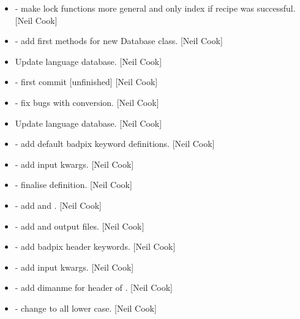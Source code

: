 \documentclass[a4paper,10pt,english]{report}
\begin{document}
\begin{itemize}
\item {} 
 - make lock functions more general and only index if
recipe was successful. {[}Neil Cook{]}

\item {} 
 - add first methods for new Database class. {[}Neil
Cook{]}

\item {} 
Update language database. {[}Neil Cook{]}

\item {} 
 - first commit {[}unfinished{]} {[}Neil Cook{]}

\item {} 
 - fix bugs with conversion. {[}Neil Cook{]}

\item {} 
Update language database. {[}Neil Cook{]}

\item {} 
 - add default badpix keyword definitions. {[}Neil Cook{]}

\item {} 
 - add input kwargs. {[}Neil Cook{]}

\item {} 
 - finalise  definition. {[}Neil Cook{]}

\item {} 
 - add  and . {[}Neil Cook{]}

\item {} 
 - add  and  output files.
{[}Neil Cook{]}

\item {} 
 - add badpix header keywords. {[}Neil Cook{]}

\item {} 
 - add input kwargs. {[}Neil Cook{]}

\item {} 
 - add dimanme for header of . {[}Neil
Cook{]}

\item {} 
 - change  to all lower case. {[}Neil Cook{]}


\end{itemize}
\end{document}
